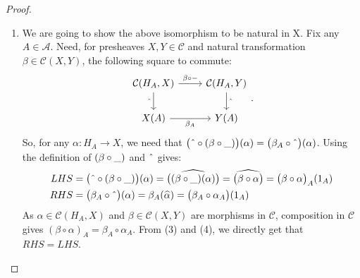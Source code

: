 \documentclass[a4paper]{article}
\theoremstyle{definition}
\begin{document}
\begin{proof}
\begin{enumerate}[label=\Roman*]
					\begin{enumerate}[label=(\roman*)]
						\item We are going to show the above isomorphism to be natural in X.
							Fix any $A \in \mathcal{A}$. Need, for
							presheaves $X,Y \in \mathcal{C}$ and
							natural transformation $\beta \in \mathcal{C} (X,Y)$, the following square to commute:
							\begin{equation*}
								\begin{tikzcd}
									\mathcal{C}(H_A,X) \arrow[swap]{d}{ \string ^}
									\arrow{r}{\beta \circ -}
			& \mathcal{C}(H_A,Y) \arrow{d}{\string ^}\\
			X(A) \arrow[swap]{r}{\beta_A}
			& Y(A)
								\end{tikzcd}.
							\end{equation*}
							So, for any $\alpha:H_A \to X$, we need that
							$\big( \string ^ \circ (\beta \circ \string _ )\big)(\alpha) = \big( \beta_A \circ \string ^
							\big)(\alpha)$. Using the definition of
							$(\beta \circ \string _ )$ and $\string ^$ gives:
							\begin{align}
								LHS & = \big( \string ^ \circ (\beta \circ \string _ ) \big)(\alpha) =
								\widehat{\big(  (\beta \circ \string _ )(\alpha)\big)}=
								\widehat{\big(  \beta \circ \alpha\big)}
								=\big(  \beta \circ \alpha\big)_A(1_A) \\
								RHS & = \big( \beta_A \circ \string ^ \big)(\alpha)
								= \beta_A (\widehat{\alpha}) =\big( \beta_A \circ \alpha_A\big)(1_A)
							\end{align}
							As $\alpha \in \mathcal{C} (H_A,X)$ and $\beta \in \mathcal{C}(X,Y)$
							are morphisms in $\mathcal{C}$, composition in $\mathcal{C}$ gives
							$(\beta \circ \alpha)_A = \beta_A \circ \alpha_A$. From (3) and (4), we
							directly get that $RHS=LHS$.


\end{enumerate}
\end{enumerate}
\end{proof}
\end{document}
